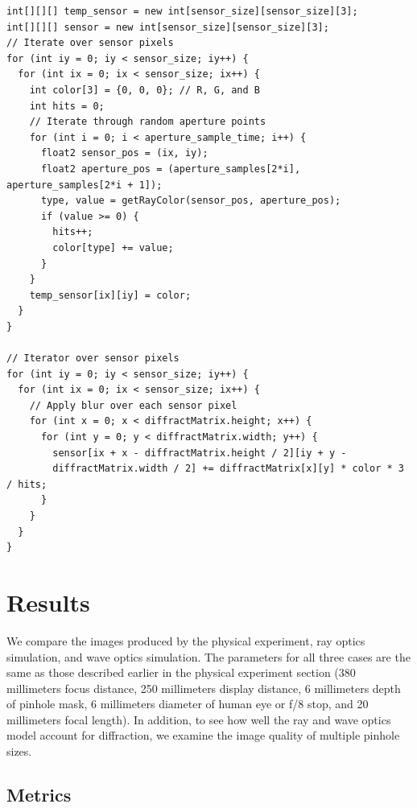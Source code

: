 \begin{lstlisting}[frame=single, basicstyle=\footnotesize\ttfamily,  columns=fullflexible, caption=Pseudocode For Wave Optics Simulation \protect\footnote{Note that the diffraction matrix varies by color. This is not shown in the pseudocode.}]
int[][][] temp_sensor = new int[sensor_size][sensor_size][3];
int[][][] sensor = new int[sensor_size][sensor_size][3];
// Iterate over sensor pixels
for (int iy = 0; iy < sensor_size; iy++) {
  for (int ix = 0; ix < sensor_size; ix++) {
    int color[3] = {0, 0, 0}; // R, G, and B
    int hits = 0;
    // Iterate through random aperture points
    for (int i = 0; i < aperture_sample_time; i++) {
      float2 sensor_pos = (ix, iy);
      float2 aperture_pos = (aperture_samples[2*i], aperture_samples[2*i + 1]);
      type, value = getRayColor(sensor_pos, aperture_pos);
      if (value >= 0) {
        hits++;
	    color[type] += value;
      }
    }
    temp_sensor[ix][iy] = color;
  }
}

// Iterator over sensor pixels
for (int iy = 0; iy < sensor_size; iy++) {
  for (int ix = 0; ix < sensor_size; ix++) {
    // Apply blur over each sensor pixel
    for (int x = 0; x < diffractMatrix.height; x++) {
      for (int y = 0; y < diffractMatrix.width; y++) {
        sensor[ix + x - diffractMatrix.height / 2][iy + y - 
        diffractMatrix.width / 2] += diffractMatrix[x][y] * color * 3 / hits;
      }
    }
  }
}
\end{lstlisting}

\section{Results}

We compare the images produced by the physical experiment, ray optics simulation, and wave optics simulation. The parameters for all three cases are the same as those described earlier in the physical experiment section (380 millimeters focus distance, 250 millimeters display distance, 6 millimeters depth of pinhole mask, 6 millimeters diameter of human eye or f/8 stop, and 20 millimeters focal length). In addition, to see how well the ray and wave optics model account for diffraction, we examine the image quality of multiple pinhole sizes.

\subsection{Metrics}

